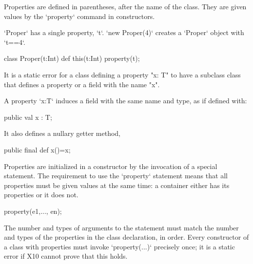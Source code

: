 Properties are defined in parentheses, after the name of the class.  They are
given values by the \xcd`property` command in constructors.

\begin{ex}
\xcd`Proper` has a single property, \xcd`t`.  \xcd`new Proper(4)` creates a
\xcd`Proper` object with \xcd`t==4`. 
\begin{xten}
class Proper(t:Int) {
  def this(t:Int) {property(t);}
}
\end{xten}

\end{ex}


It is a static error for a class
defining a property \xcd"x: T" to have a subclass class that defines
a property or a field with the name \xcd"x".


A property \xcd`x:T` induces a field with the same name and type, 
as if defined with: 
\begin{xten}
public val x : T;
\end{xten} 
\noindent It also defines a nullary getter method, 
\begin{xten}
public final def x()=x;
\end{xten}





Properties are initialized in a constructor by the invocation of a special 
statement. The requirement to use the \xcd`property` statement means that all properties
must be given values at the same time: a container either has its properties
or it does not.
\begin{xten}
property(e1,..., en);
\end{xten}
The number and types of arguments to the  statement must match
the number and types of the properties in the class declaration, in order.  
Every constructor of a class with properties must invoke \xcd`property(...)`
precisely once; it is a static error if X10 cannot prove that this holds.



